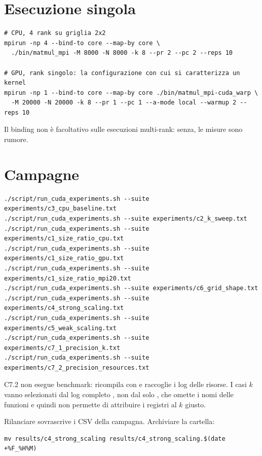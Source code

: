 \section{Esecuzione singola}

\begin{lstlisting}[language=shell]
# CPU, 4 rank su griglia 2x2
mpirun -np 4 --bind-to core --map-by core \
  ./bin/matmul_mpi -M 8000 -N 8000 -k 8 --pr 2 --pc 2 --reps 10

# GPU, rank singolo: la configurazione con cui si caratterizza un kernel
mpirun -np 1 --bind-to core --map-by core ./bin/matmul_mpi-cuda_warp \
  -M 20000 -N 20000 -k 8 --pr 1 --pc 1 --a-mode local --warmup 2 --reps 10
\end{lstlisting}

Il binding non \`e facoltativo sulle esecuzioni multi-rank: senza, le misure sono
rumore.

\section{Campagne}

\begin{lstlisting}[language=shell]
./script/run_cuda_experiments.sh --suite experiments/c3_cpu_baseline.txt
./script/run_cuda_experiments.sh --suite experiments/c2_k_sweep.txt
./script/run_cuda_experiments.sh --suite experiments/c1_size_ratio_cpu.txt
./script/run_cuda_experiments.sh --suite experiments/c1_size_ratio_gpu.txt
./script/run_cuda_experiments.sh --suite experiments/c1_size_ratio_mpi20.txt
./script/run_cuda_experiments.sh --suite experiments/c6_grid_shape.txt
./script/run_cuda_experiments.sh --suite experiments/c4_strong_scaling.txt
./script/run_cuda_experiments.sh --suite experiments/c5_weak_scaling.txt
./script/run_cuda_experiments.sh --suite experiments/c7_1_precision_k.txt
./script/run_cuda_experiments.sh --suite experiments/c7_2_precision_resources.txt
\end{lstlisting}

C7.2 non esegue benchmark: ricompila con  e raccoglie i log
delle risorse. I casi $k$ vanno selezionati dal log completo
\file{*\_ptxas\_*.txt}, non dal solo \file{*\_registers.txt}, che omette i nomi
delle funzioni e quindi non permette di attribuire i registri al $k$ giusto.

\begin{tcolorbox}[colback=todogiallo,colframe=todorosso,boxrule=0.5pt,
                  title=\textbf{Prima di rilanciare una campagna}]
Rilanciare sovrascrive i CSV della campagna. Archiviare la cartella:
\begin{lstlisting}[language=shell]
mv results/c4_strong_scaling results/c4_strong_scaling.$(date +%F_%H%M)
\end{lstlisting}
\end{tcolorbox}

